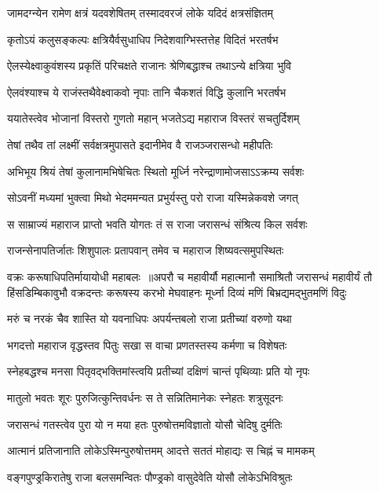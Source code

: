 \twolineshloka
{जामदग्न्येन रामेण क्षत्रं यदवशेषितम्}
{तस्मादवरजं लोके यदिदं क्षत्रसंज्ञितम्}


\twolineshloka
{कृतोऽयं कलुसङ्कल्पः क्षत्रियैर्वसुधाधिप}
{निदेशवाग्भिस्तत्तेह विदितं भरतर्षभ}


\twolineshloka
{ऐलस्येक्ष्वाकुवंशस्य प्रकृतिं परिचक्षते}
{राजानः श्रेणिबद्धाश्च तथाऽन्ये क्षत्रिया भुवि}


\twolineshloka
{ऐलवंश्याश्च ये राजंस्तथैवेक्ष्वाकवो नृपाः}
{तानि चैकशतं विद्धि कुलानि भरतर्षभ}


\twolineshloka
{ययातेस्त्वेव भोजानां विस्तरो गुणतो महान्}
{भजतेऽद्य महाराज विस्तरं सचतुर्दिशम्}


\twolineshloka
{तेषां तथैव तां लक्ष्मीं सर्वक्षत्रमुपासते}
{इदानीमेव वै राजञ्जरासन्धो महीपतिः}


\twolineshloka
{अभिभूय श्रियं तेषां कुलानामभिषेचितः}
{स्थितो मूर्ध्नि नरेन्द्राणामोजसाऽऽक्रम्य सर्वशः}


\twolineshloka
{सोऽवनीं मध्यमां भुक्त्वा मिथो भेदममन्यत}
{प्रभुर्यस्तु परो राजा यस्मिन्नेकवशे जगत्}


\twolineshloka
{स साम्राज्यं महाराज प्राप्तो भवति योगतः}
{तं स राजा जरासन्धं संश्रित्य किल सर्वशः}


\twolineshloka
{राजन्सेनापतिर्जातः शिशुपालः प्रतापवान्}
{तमेव च महाराज शिष्यवत्समुपस्थितः}


वक्रः करूषाधिपतिर्मायायोधी महाबलः ॥अपरौ च महावीर्यौ महात्मानौ समाश्रितौ
\threelineshloka
{जरासन्धं महावीर्यं तौ हिंसडिम्बिकावुभौ}
{वक्रदन्तः करूषस्य करभो मेघवाहनः}
{मूर्ध्ना दिव्यं मणिं बिभ्रद्यमद्भुतमणिं विदुः}


\twolineshloka
{मरुं च नरकं चैव शास्ति यो यवनाधिपः}
{अपर्यन्तबलो राजा प्रतीच्यां वरुणो यथा}


\twolineshloka
{भगदत्तो महाराज वृद्धस्तव पितुः सखा}
{स वाचा प्रणतस्तस्य कर्मणा च विशेषतः}


\twolineshloka
{स्नेहबद्धश्च मनसा पितृवद्भक्तिमांस्त्वयि}
{प्रतीच्यां दक्षिणं चान्तं पृथिव्याः प्रति यो नृपः}


\twolineshloka
{मातुलो भवतः शूरः पुरुजित्कुन्तिवर्धनः}
{स ते सन्नितिमानेकः स्नेहतः शत्रुसूदनः}


\twolineshloka
{जरासन्धं गतस्त्वेव पुरा यो न मया हतः}
{पुरुषोत्तमविज्ञातो योसौ चेदिषु दुर्मतिः}


\twolineshloka
{आत्मानं प्रतिजानाति लोकेऽस्मिन्पुरुषोत्तमम्}
{आदत्ते सततं मोहाद्यः स चिह्नं च मामकम्}


\twolineshloka
{वङ्गपुण्ड्रकिरातेषु राजा बलसमन्वितः}
{पौण्ड्रको वासुदेवेति योसौ लोकेऽभिविश्रुतः}


